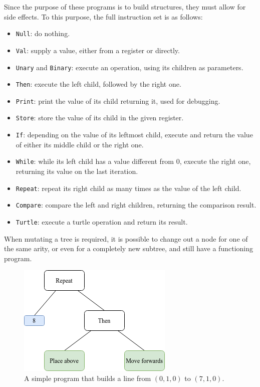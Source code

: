 \documentclass{report}
\begin{document}
Since the purpose of these programs is to build structures, they must allow for side effects. To this purpose, the full instruction set is as follows:
\begin{itemize}
    \item \verb|Null|: do nothing.
    \item \verb|Val|: supply a value, either from a register or directly.
    \item \verb|Unary| and \verb|Binary|: execute an operation, using its children as parameters.
    \item \verb|Then|: execute the left child, followed by the right one.
    \item \verb|Print|: print the value of its child returning it, used for debugging.
    \item \verb|Store|: store the value of its child in the given register.
    \item \verb|If|: depending on the value of its leftmost child, execute and return the value of either its middle child or the right one.
    \item \verb|While|: while its left child has a value different from $0$, execute the right one, returning its value on the last iteration. 
    \item \verb|Repeat|: repeat its right child as many times as the value of the left child.
    \item \verb|Compare|: compare the left and right children, returning the comparison result.
    \item \verb|Turtle|: execute a turtle operation and return its result.
\end{itemize}

When mutating a tree is required, it is possible to change out a node for one of the same arity, or even for a completely new subtree, and still have a functioning program.

\begin{figure}[H]
    \centering
    \includegraphics[scale=0.75]{tree_2}
    \caption{A simple program that builds a line from $(0, 1, 0)$ to $(7, 1, 0)$.}
\end{figure}
\end{document}
